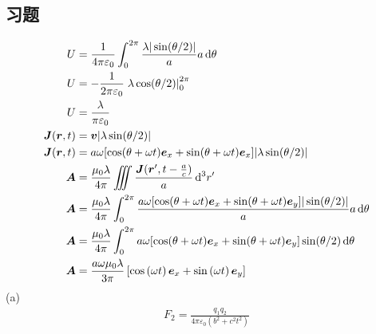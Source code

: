 \subsection{习题}
\begin{align*}
    U&=\frac{1}{4\pi\varepsilon_0}\int_0^{2\pi}\frac{\lambda|\sin(\theta/2)|}{a}a\dif \theta\\
    U&=-\frac{1}{2\pi\varepsilon_0}\left.\lambda\cos(\theta/2)\right|_0^{2\pi}\\
    U&=\frac{\lambda}{\pi\varepsilon_0}\\
    \boldsymbol{J}(\boldsymbol{r},t)&=\boldsymbol{v}|\lambda\sin(\theta/2)|\\
    \boldsymbol{J}(\boldsymbol{r},t)&=a\omega[ \cos(\theta+\omega t)\boldsymbol{e}_x+\sin(\theta+\omega t)\boldsymbol{e}_x]|\lambda\sin(\theta/2)|\\
    \boldsymbol{A}&=\frac{\mu_0\lambda}{4\pi}\iiint\frac{\boldsymbol{J}(\boldsymbol{r}', t-\frac{a}{c})}{a}\dif ^3r'\\
    \boldsymbol{A}&=\frac{\mu_0\lambda}{4\pi}\int_0^{2\pi}\frac{a\omega[ \cos(\theta+\omega t)\boldsymbol{e}_x+\sin(\theta+\omega t)\boldsymbol{e}_y]|\sin(\theta/2)|}{a}a\dif \theta\\
    \boldsymbol{A}&=\frac{\mu_0\lambda}{4\pi}\int_0^{2\pi}a\omega[ \cos(\theta+\omega t)\boldsymbol{e}_x+\sin(\theta+\omega t)\boldsymbol{e}_y]\sin(\theta/2)\dif \theta\\
    \boldsymbol{A}&=\frac{a\omega\mu_0\lambda}{3\pi}
    \left[\cos\left(\omega t\right)
    \boldsymbol{e}_x
    +\sin\left(\omega t\right)\boldsymbol{e}_y
    \right]
\end{align*}
(a)
\begin{align*}
    F_2=\frac{q_1q_2}{4\pi\varepsilon_0(b^2+c^2t^2)}
\end{align*}

